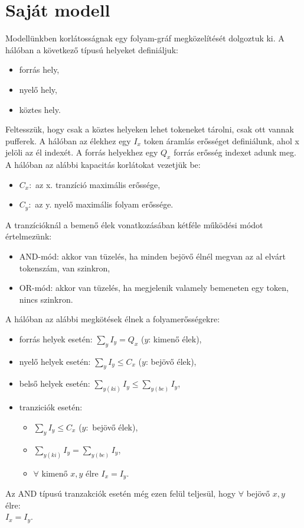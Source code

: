 \section{Saját modell}

Modellünkben korlátosságnak egy folyam-gráf megközelítését dolgoztuk ki.  A hálóban a következő típusú helyeket definiáljuk:
\begin{itemize}
\item forrás hely,
\item nyelő hely,
\item köztes hely.
\end{itemize}
Feltesszük, hogy csak a köztes helyeken lehet tokeneket tárolni, csak ott vannak pufferek. A hálóban az élekhez egy $I_x$ token áramlás erősséget definiálunk, ahol x jelöli az él indexét. A forrás helyekhez egy $Q_x$ forrás erősség indexet adunk meg. A hálóban az alábbi kapacitás korlátokat vezetjük be:
\begin{itemize}
\item $C_x:$ az x. tranzíció maximális erőssége,
\item $C_y:$ az y. nyelő maximális folyam erőssége.
\end{itemize}

A tranzícióknál a bemenő élek vonatkozásában kétféle működési módot értelmezünk:
\begin{itemize}
\item AND-mód: akkor van tüzelés, ha minden bejövő élnél megvan az al elvárt tokenszám, van szinkron,
\item OR-mód: akkor van tüzelés, ha megjelenik valamely bemeneten egy token, nincs szinkron.
\end{itemize}
A hálóban az alábbi megkötések élnek a folyamerősségekre:
\begin{itemize}
\item forrás helyek esetén: $\sum_y I_y=Q_x$ ($y$: kimenő élek),
\item nyelő helyek esetén: $\sum_y I_y \leq C_x$ ($y$: bejövő élek),
\item belső helyek esetén: 
$\sum_{y(ki)} I_y\leq \sum_{y(be)} I_y$,
\item tranziciók esetén: 
\begin{itemize}
\item $\sum_y I_y\leq C_x$ ($y:$ bejövő élek),
\item $\sum_{y(ki)} I_y = \sum_{y(be)} I_y$,
\item $\forall$ kimenő $x,y$ élre $I_x=I_y$.
\end{itemize}
\end{itemize}
Az AND típusú tranzakciók esetén még ezen felül teljesül, hogy $\forall$ bejövő $x,y$ élre:\\
$I_x = I_y$.

